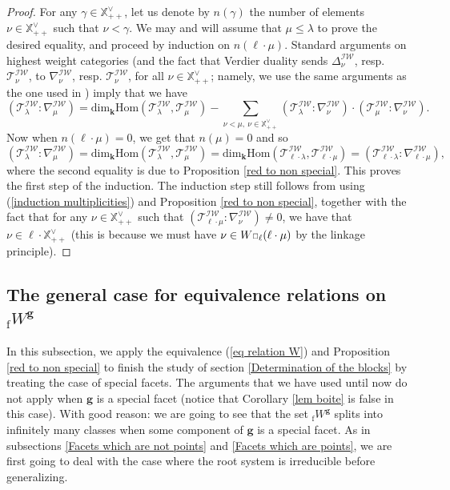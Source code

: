 \documentclass[11pt]{amsart}
\theoremstyle{plain}
\theoremstyle{remark}
\newcommand{\car}{\mbox{\relsize{-5}$\Box$}}
\numberwithin{equation}{section}
\begin{document}
	\begin{proof}
	For any $\gamma\in\mathbb{X}^\vee_{++}$, let us denote by $n(\gamma)$ the number of elements $\nu\in\mathbb{X}^\vee_{++}$ such that $\nu< \gamma$.  We may and will assume that $\mu\leq \lambda$ to prove the desired equality, and proceed by induction on $n(\ell\cdot\mu)$. Standard arguments on highest weight categories (and the fact that Verdier duality sends $\Delta^\mathcal{IW}_\nu$, resp. $\mathscr{T}^\mathcal{IW}_{\nu}$, to $\nabla^\mathcal{IW}_{\nu}$, resp. $\mathscr{T}^\mathcal{IW}_{\nu}$, for all $\nu\in\mathbb{X}^\vee_{++}$; namely, we use the same arguments as the one used in \cite[§6.2]{achar2016modular}) imply that we have 
	\begin{equation}\label{induction multiplicities}
	    (\mathscr{T}^\mathcal{IW}_{\lambda}:\nabla^\mathcal{IW}_{\mu})=\mathrm{dim}_\mathbf{k}\mathrm{Hom}(\mathscr{T}^\mathcal{IW}_{\lambda},\mathscr{T}^\mathcal{IW}_{\mu})-\sum_{\nu<\mu,~\nu\in\mathbb{X}^\vee_{++}}(\mathscr{T}^\mathcal{IW}_{\lambda}:\nabla^\mathcal{IW}_{\nu})\cdot (\mathscr{T}^\mathcal{IW}_{\mu}:\nabla^\mathcal{IW}_{\nu}).
	\end{equation}
	Now when $n(\ell\cdot\mu)=0$, we get that $n(\mu)=0$ and so
	$$(\mathscr{T}^\mathcal{IW}_{\lambda}:\nabla^\mathcal{IW}_{\mu})=\mathrm{dim}_\mathbf{k}\mathrm{Hom}(\mathscr{T}^\mathcal{IW}_{\lambda},\mathscr{T}^\mathcal{IW}_{\mu})=\mathrm{dim}_\mathbf{k}\mathrm{Hom}(\mathscr{T}^\mathcal{IW}_{\ell\cdot\lambda},\mathscr{T}^\mathcal{IW}_{\ell\cdot\mu})=(\mathscr{T}^\mathcal{IW}_{\ell\cdot\lambda}:\nabla^\mathcal{IW}_{\ell\cdot\mu}), $$
	where the second equality is due to Proposition \ref{red to non special}. This proves the first step of the induction. The induction step still follows from using (\ref{induction multiplicities}) and Proposition \ref{red to non special}, together with the fact that  for any $\nu\in\mathbb{X}^\vee_{++}$ such that $(\mathscr{T}^\mathcal{IW}_{\ell\cdot\mu}:\nabla^\mathcal{IW}_{\nu})\neq 0$, we have that $\nu\in\ell\cdot\mathbb{X}^\vee_{++}$ (this is because we must have $\nu\in W\car_\ell(\ell\cdot\mu)$ by the linkage principle).
	\end{proof}
	
	\subsection{The general case for equivalence relations on ${_\mathrm{f}W}^\mathbf{g}$}\label{section special}
	In this subsection, we apply the equivalence (\ref{eq relation W}) and Proposition \ref{red to non special} to finish the study of section \ref{Determination of the blocks} by treating the case of special facets. The arguments that we have used until now do not apply when $\mathbf{g}$ is a special facet (notice that Corollary \ref{lem boite} is false in this case). With good reason: we are going to see that the set ${_\mathrm{f}W}^\mathbf{g}$ splits into infinitely many classes when some component of $\mathbf{g}$ is a special facet. As in subsections \ref{Facets which are not points} and \ref{Facets which are points}, we are first going to deal with the case where the root system is irreducible before generalizing. 
	
\end{document}
